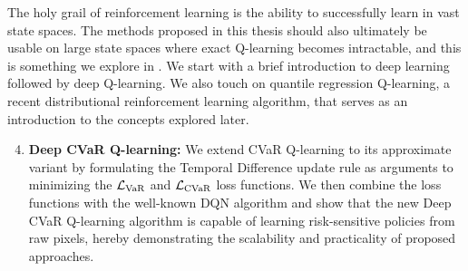 The holy grail of reinforcement learning is the ability to successfully learn in vast state spaces. The methods proposed in this thesis should also ultimately be usable on large state spaces where exact Q-learning becomes intractable, and this is something we explore in .
We start with a brief introduction to deep learning followed by deep Q-learning. We also touch on quantile regression Q-learning, a recent distributional reinforcement learning algorithm, that serves as an introduction to the concepts explored later.

\begin{enumerate}
\setcounter{enumi}{3}
\item \textbf{Deep CVaR Q-learning:}  We extend CVaR Q-learning to its approximate variant by formulating the Temporal Difference update rule as arguments to minimizing the $\mathcal{L}_{\text{VaR}}$ and $\mathcal{L}_{\text{CVaR}}$ loss functions. We then combine the loss functions with the well-known DQN \citep{mnih2015human} algorithm and show that the new Deep CVaR Q-learning algorithm is capable of learning risk-sensitive policies from raw pixels, hereby demonstrating the scalability and practicality of proposed approaches.
\end{enumerate}


